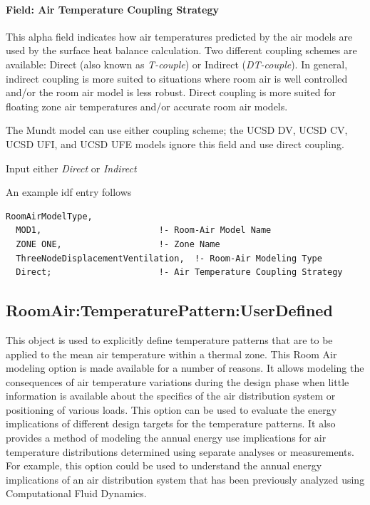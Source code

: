 \paragraph{Field: Air Temperature Coupling Strategy}\label{field-air-temperature-coupling-strategy}

This alpha field indicates how air temperatures predicted by the air models are used by the surface heat balance calculation. Two different coupling schemes are available: Direct (also known as \emph{T-couple}) or Indirect (\emph{DT-couple}). In general, indirect coupling is more suited to situations where room air is well controlled and/or the room air model is less robust. Direct coupling is more suited for floating zone air temperatures and/or accurate room air models.

The Mundt model can use either coupling scheme; the UCSD DV, UCSD CV, UCSD UFI, and UCSD UFE models ignore this field and use direct coupling.

Input either \emph{Direct} or \emph{Indirect}

An example idf entry follows

\begin{lstlisting}
RoomAirModelType,
  MOD1,                       !- Room-Air Model Name
  ZONE ONE,                   !- Zone Name
  ThreeNodeDisplacementVentilation,  !- Room-Air Modeling Type
  Direct;                     !- Air Temperature Coupling Strategy
\end{lstlisting}

\subsection{RoomAir:TemperaturePattern:UserDefined}\label{roomairtemperaturepatternuserdefined}

This object is used to explicitly define temperature patterns that are to be applied to the mean air temperature within a thermal zone. This Room Air modeling option is made available for a number of reasons. It allows modeling the consequences of air temperature variations during the design phase when little information is available about the specifics of the air distribution system or positioning of various loads. This option can be used to evaluate the energy implications of different design targets for the temperature patterns. It also provides a method of modeling the annual energy use implications for air temperature distributions determined using separate analyses or measurements. For example, this option could be used to understand the annual energy implications of an air distribution system that has been previously analyzed using Computational Fluid Dynamics.

